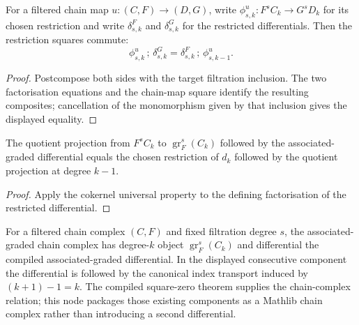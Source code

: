 \begin{theorem}
  \label{thm:filtered-chain-map-restricted-differential}
  \leanok
  For a filtered chain map $u:(C,F)\to(D,G)$, write
  $\phi^u_{s,k}:F^sC_k\to G^sD_k$ for its chosen restriction and write
  $\delta^F_{s,k}$ and $\delta^G_{s,k}$ for the restricted differentials.
  Then the restriction squares commute:
  \[
    \phi^u_{s,k}\,;\,\delta^G_{s,k}
      =\delta^F_{s,k}\,;\,\phi^u_{s,k-1}.
  \]
\end{theorem}

\begin{proof}
  \leanok
  Postcompose both sides with the target filtration inclusion.  The two
  factorisation equations and the chain-map square identify the resulting
  composites; cancellation of the monomorphism given by that inclusion gives
  the displayed equality.
\end{proof}

\begin{lemma}
  \label{lem:filtered-associated-graded-differential-projection}
  \leanok
  The quotient projection from $F^sC_k$ to
  $\operatorname{gr}^s_F(C_k)$ followed by the associated-graded differential
  equals the chosen restriction of $d_k$ followed by the quotient projection at
  degree $k-1$.
\end{lemma}

\begin{proof}
  \leanok
  Apply the cokernel universal property to the defining factorisation of the
  restricted differential.
\end{proof}

\begin{definition}
  \label{def:filtered-associated-graded-complex}
  \leanok
  For a filtered chain complex $(C,F)$ and fixed filtration degree $s$, the
  associated-graded chain complex has degree-$k$ object
  $\operatorname{gr}^s_F(C_k)$ and differential the compiled
  associated-graded differential.  In the displayed consecutive component the
  differential is followed by the canonical index transport induced by
  $(k+1)-1=k$.  The compiled square-zero theorem supplies the chain-complex
  relation; this node packages those existing components as a Mathlib chain
  complex rather than introducing a second differential.
\end{definition}

